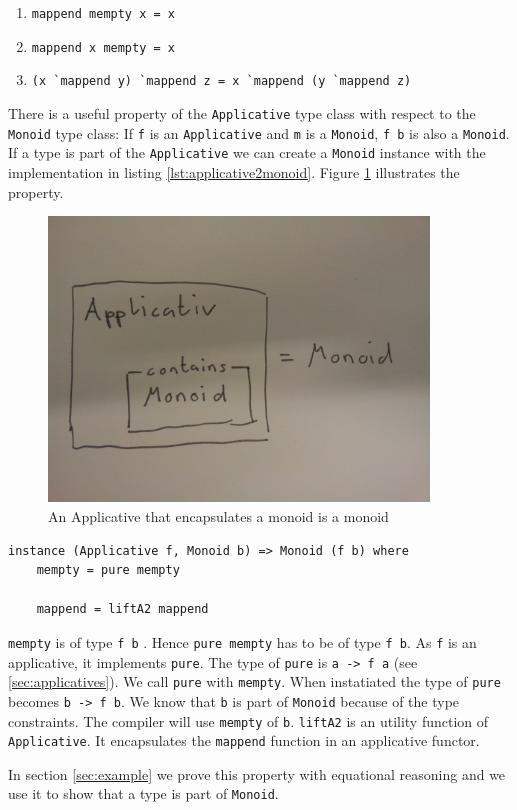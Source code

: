 \begin{enumerate}
\item \verb|mappend mempty x = x|
\item \verb|mappend x mempty = x|
\item \verb|(x `mappend y) `mappend z = x `mappend (y `mappend z)|
\end{enumerate}

There is a useful property of the \verb|Applicative| type class with respect to the \verb|Monoid| type class: If \verb|f| is an \verb|Applicative| and \verb|m| is a \verb|Monoid|, \verb|f b| is also a \verb|Monoid|. If a type is part of the \verb|Applicative| we can create a \verb|Monoid| instance with the implementation in listing \ref{lst:applicative2monoid}. Figure \ref{fig:applicative_monoid} illustrates the property.

\begin{figure}
  \centering
     \includegraphics[width=0.9\textwidth]{applicative_monoid}
  \caption{An Applicative that encapsulates a monoid is a monoid}
  \label{fig:applicative_monoid}
\end{figure}

\begin{program}
\begin{verbatim}
instance (Applicative f, Monoid b) => Monoid (f b) where
    mempty = pure mempty

    mappend = liftA2 mappend
\end{verbatim}
\label{lst:applicative2monoid}
\caption{Applicative property}
\end{program}

\verb|mempty| is of type \verb|f b| . Hence \verb|pure mempty| has to be of type \verb|f b|.
As \verb|f| is an applicative, it implements \verb|pure|. The type of \verb|pure| is \verb|a -> f a| (see \ref{sec:applicatives}). We call \verb|pure| with \verb|mempty|. When instatiated the type of \verb|pure| becomes \verb|b -> f b|.  We know that \verb|b| is part of \verb|Monoid| because of the type constraints. The compiler will use \verb|mempty| of \verb|b|.  \verb|liftA2| is an utility function of \verb|Applicative|. It encapsulates the \verb|mappend| function in an applicative functor. 



In section \ref{sec:example} we prove this property with equational reasoning and we use it to show that a type is part of \verb|Monoid|.
